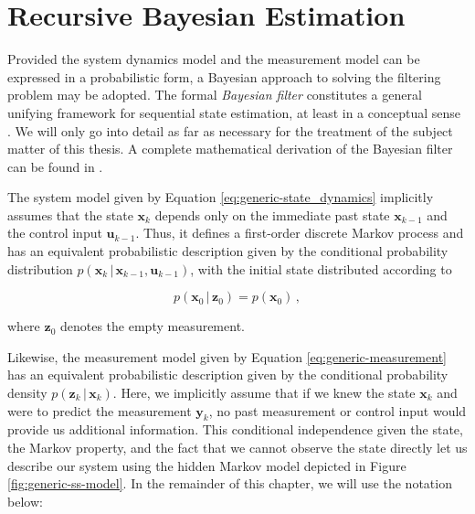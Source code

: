 \section{Recursive Bayesian Estimation}\label{sec:bayesian_estimation}

Provided the system dynamics model and the measurement model can be expressed in a probabilistic form, a Bayesian approach to solving the filtering problem may be adopted. The formal \emph{Bayesian filter} constitutes a general unifying framework for sequential state estimation, at least in a conceptual sense \cite{haykin2009neural}. We will only go into detail as far as necessary for the treatment of the subject matter of this thesis. A complete mathematical derivation of the Bayesian filter can be found in \cite{thrun2005probabilistic}.


The system model given by Equation \ref{eq:generic-state_dynamics} implicitly assumes that the state $\bm{x}_k$ depends only on the immediate past state $\bm{x}_{k-1}$ and the control input $\bm{u}_{k-1}$. Thus, it defines a first-order discrete Markov process and has an equivalent probabilistic description given by the conditional probability distribution $p(\bm{x}_k\,|\,\bm{x}_{k-1}, \bm{u}_{k-1})$, with the initial state distributed according to 

\begin{equation}\label{eq:initial_markov}
  p(\bm{x}_0\,|\,\bm{z}_0) = p(\bm{x}_0)\,,
\end{equation}

\noindent
where $\bm{z}_0$ denotes the empty measurement.

Likewise, the measurement model given by Equation \ref{eq:generic-measurement} has an equivalent probabilistic description given by the conditional probability density $p(\bm{z}_k\,|\,\bm{x}_{k})$. Here, we implicitly assume that if we knew the state $\bm{x}_{k}$ and were to predict the measurement $\bm{y}_{k}$, no past measurement or control input would provide us additional information. This conditional independence given the state, the Markov property, and the fact that we cannot observe the state directly let us describe our system using the hidden Markov model depicted in Figure \ref{fig:generic-ss-model}. In the remainder of this chapter, we will use the notation below:


